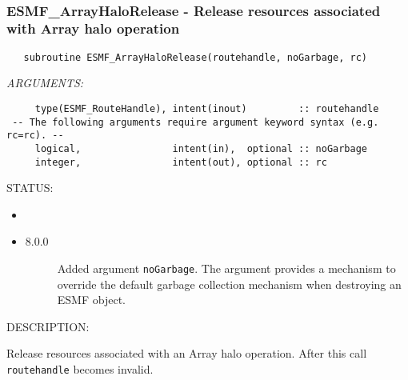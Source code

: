 \mbox{}\hrulefill\ 
 
\subsubsection [ESMF\_ArrayHaloRelease] {ESMF\_ArrayHaloRelease - Release resources associated with Array halo operation}


  
\begin{verbatim}   subroutine ESMF_ArrayHaloRelease(routehandle, noGarbage, rc)\end{verbatim}{\em ARGUMENTS:}
\begin{verbatim}     type(ESMF_RouteHandle), intent(inout)         :: routehandle
 -- The following arguments require argument keyword syntax (e.g. rc=rc). --
     logical,                intent(in),  optional :: noGarbage
     integer,                intent(out), optional :: rc\end{verbatim}
{\sf STATUS:}
   \begin{itemize}
   \item{}
   \item{}
   \begin{description}
   \item[8.0.0] Added argument {\tt noGarbage}.
     The argument provides a mechanism to override the default garbage collection
     mechanism when destroying an ESMF object.
   \end{description}
   \end{itemize}
  
{\sf DESCRIPTION:\\ }


     Release resources associated with an Array halo operation. 
     After this call {\tt routehandle} becomes invalid.
  
